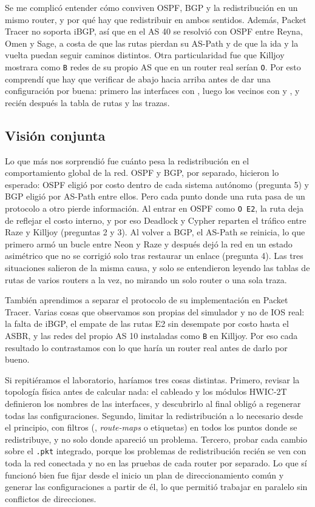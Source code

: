 Se me complicó entender cómo conviven OSPF, BGP y la redistribución en un mismo router, y por qué hay que redistribuir en ambos sentidos. Además, Packet Tracer no soporta iBGP, así que en el AS 40 se resolvió con OSPF entre Reyna, Omen y Sage, a costa de que las rutas pierdan su AS-Path y de que la ida y la vuelta puedan seguir caminos distintos. Otra particularidad fue que Killjoy mostrara como \texttt{B} redes de su propio AS que en un router real serían \texttt{O}.
Por esto comprendí que hay que verificar de abajo hacia arriba antes de dar una configuración por buena: primero las interfaces con , luego los vecinos con  y , y recién después la tabla de rutas y las trazas.



\subsection*{Visión conjunta}
Lo que más nos sorprendió fue cuánto pesa la redistribución en el comportamiento global de la red. OSPF y BGP, por separado, hicieron lo esperado: OSPF eligió por costo dentro de cada sistema autónomo (pregunta 5) y BGP eligió por AS-Path entre ellos. Pero cada punto donde una ruta pasa de un protocolo a otro pierde información. Al entrar en OSPF como \texttt{O E2}, la ruta deja de reflejar el costo interno, y por eso Deadlock y Cypher reparten el tráfico entre Raze y Killjoy (preguntas 2 y 3). Al volver a BGP, el AS-Path se reinicia, lo que primero armó un bucle entre Neon y Raze y después dejó la red en un estado asimétrico que no se corrigió solo tras restaurar un enlace (pregunta 4). Las tres situaciones salieron de la misma causa, y solo se entendieron leyendo las tablas de rutas de varios routers a la vez, no mirando un solo router o una sola traza.

También aprendimos a separar el protocolo de su implementación en Packet Tracer. Varias cosas que observamos son propias del simulador y no de IOS real: la falta de iBGP, el empate de las rutas E2 sin desempate por costo hasta el ASBR, y las redes del propio AS 10 instaladas como \texttt{B} en Killjoy. Por eso cada resultado lo contrastamos con lo que haría un router real antes de darlo por bueno.

Si repitiéramos el laboratorio, haríamos tres cosas distintas. Primero, revisar la topología física antes de calcular nada: el cableado y los módulos HWIC-2T definieron los nombres de las interfaces, y descubrirlo al final obligó a regenerar todas las configuraciones. Segundo, limitar la redistribución a lo necesario desde el principio, con filtros (, \textit{route-maps} o etiquetas) en todos los puntos donde se redistribuye, y no solo donde apareció un problema. Tercero, probar cada cambio sobre el \texttt{.pkt} integrado, porque los problemas de redistribución recién se ven con toda la red conectada y no en las pruebas de cada router por separado. Lo que sí funcionó bien fue fijar desde el inicio un plan de direccionamiento común y generar las configuraciones a partir de él, lo que permitió trabajar en paralelo sin conflictos de direcciones.
